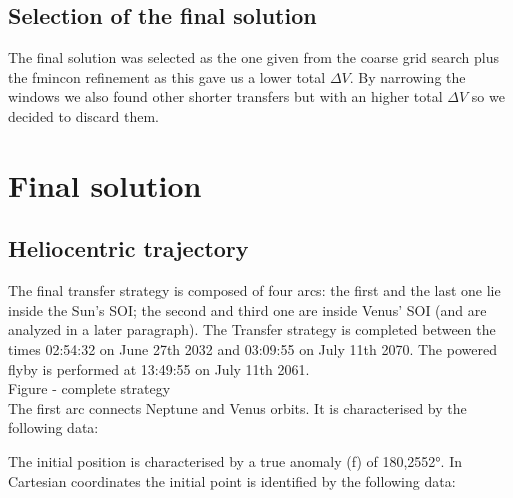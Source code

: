 \documentclass[11pt,a4paper]{report}
\begin{document}
\subsection{Selection of the final solution}
The final solution was selected as the one given from the coarse grid search plus the fmincon refinement as this gave us a lower total $\Delta V$. By narrowing the windows we also found other shorter transfers but with an higher total $\Delta V$ so we decided to discard them.

\section{Final solution}

\subsection{Heliocentric trajectory}
The final transfer strategy is composed of four arcs: the first and the last one lie inside the Sun’s SOI; the second and third one are inside Venus’ SOI (and are analyzed in a later paragraph). 
The Transfer strategy is completed between the times 02:54:32 on June 27th 2032 and 03:09:55 on July 11th 2070. The powered flyby is performed at 13:49:55 on July 11th 2061.\\
Figure - complete strategy\\
The first arc connects Neptune and Venus orbits. It is characterised by the following data:

\begin{table}[H]
\centering
{}
\end{table}

The initial position is characterised by a true anomaly (f) of 180,2552°. In Cartesian coordinates the initial point is identified by the following data:

\begin{table}[H]
\centering
{}
\end{table}
\end{document}
